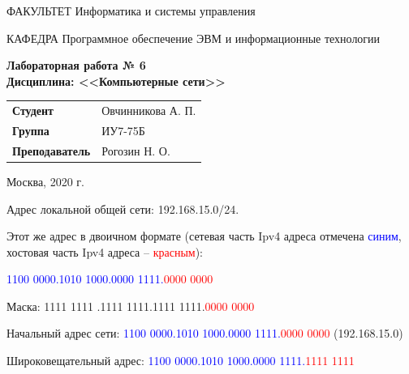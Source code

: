 \documentclass[a4paper,14pt]{article}
\begin{document}
\begin{titlepage}
    \begin{flushleft}
        ФАКУЛЬТЕТ Информатика и системы управления
    \end{flushleft}
    КАФЕДРА Программное обеспечение ЭВМ и информационные технологии

    \vspace{3cm}

    \begin{center}
        \textbf{Лабораторная работа № 6} \\
        \textbf{Дисциплина: <<Компьютерные сети>>}
        \vspace{0.5cm}
    \end{center}


    \vspace{3cm}

    \begin{flushleft}
        \begin{tabular}{ll}
            \textbf{Студент}       & Овчинникова А. П. \\
            \textbf{Группа}        & ИУ7-75Б           \\
            \textbf{Преподаватель} & Рогозин Н. О.     \\
        \end{tabular}
    \end{flushleft}

    \vspace{3cm}

    \begin{center}
        Москва, 2020 г.
    \end{center}

\end{titlepage}

\setcounter{page}{2}

Адрес локальной общей сети: 192.168.15.0/24.

Этот же адрес в двоичном формате (сетевая часть Ipv4 адреса отмечена \textcolor{blue}{синим}, хостовая часть Ipv4 адреса – \textcolor{red}{красным}):

\textcolor{blue}{1100 0000.1010 1000.0000 1111.}\textcolor{red}{0000 0000}

Маска:	1111 1111 .1111  1111.1111 1111.\textcolor{red}{0000 0000}

Начальный адрес сети: \textcolor{blue}{1100 0000.1010 1000.0000 1111.}\textcolor{red}{0000 0000} (192.168.15.0)

Широковещательный адрес: \textcolor{blue}{1100 0000.1010 1000.0000 1111.}\textcolor{red}{1111 1111}
\end{document}

